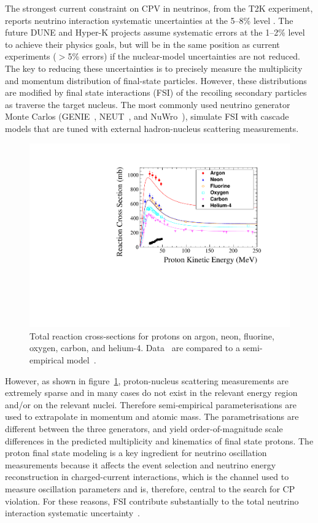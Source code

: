 The strongest current constraint on CPV in neutrinos, from the T2K experiment, reports neutrino interaction systematic uncertainties at the 5--8\% level \cite{Abe:2018wpn}.
The future DUNE and Hyper-K projects assume systematic errors at the 1--2\% level to achieve their physics goals, but will be in the same position as current experiments ($>$5\% errors) if the nuclear-model uncertainties are not reduced.  
The key to reducing these uncertainties is to precisely measure the multiplicity and momentum distribution of final-state particles. 
However, these distributions are modified by final state interactions (FSI) of the recoiling secondary particles as traverse the target nucleus.  
The most commonly used neutrino generator Monte Carlos (GENIE~\cite{Andreopoulos:2009rq}, NEUT~\cite{Hayato:2009zz}, and NuWro~\cite{GOLAN2012499}), simulate FSI with cascade models that are tuned with external hadron-nucleus scattering measurements.
\begin{figure}%
    \centering
    \includegraphics[width=12cm]{files/Figures/DataProtonCrossSections.pdf}%
    \caption{Total reaction cross-sections for protons on argon, neon, fluorine, oxygen, carbon, and helium-4. Data~\cite{Carlson:1996ofz} are compared to a semi-empirical model~\cite{wellisch1996total}.}
    \label{fig:DataProtonXSec}%
\end{figure}

However, as shown in figure~\ref{fig:DataProtonXSec}, proton-nucleus scattering measurements are extremely sparse and in many cases do not exist in the relevant energy region and/or on the relevant nuclei.
Therefore semi-empirical parameterisations are used to extrapolate in momentum and atomic mass.  
The parametrisations are different between the three generators, and yield order-of-magnitude scale differences in the predicted multiplicity and kinematics of final state protons.
The proton final state modeling is a key ingredient for neutrino oscillation measurements because it affects the event selection and neutrino energy reconstruction in charged-current interactions, which is the channel used to measure oscillation parameters and is, therefore, central to the search for CP violation\cite{Abe:2013hdq}.
For these reasons, FSI contribute substantially to the total neutrino interaction systematic uncertainty~\cite{Abe:2018wpn}.

